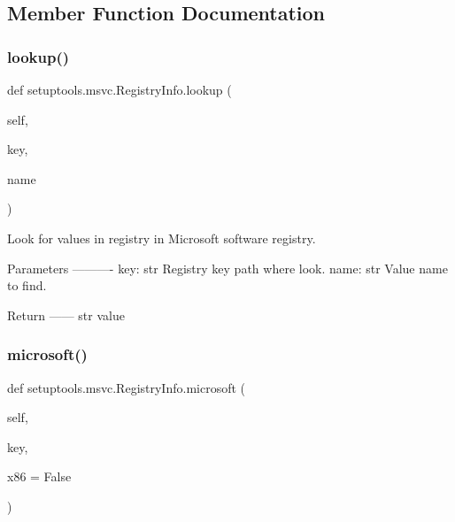 \subsection{Member Function Documentation}
\mbox{\label{classsetuptools_1_1msvc_1_1RegistryInfo_afc91b9bf7451e111733eebb84a3b27f6}} 
\subsubsection{\texorpdfstring{lookup()}{lookup()}}
{\footnotesize\ttfamily def setuptools.\+msvc.\+Registry\+Info.\+lookup (\begin{DoxyParamCaption}\item[{}]{self,  }\item[{}]{key,  }\item[{}]{name }\end{DoxyParamCaption})}

\begin{DoxyVerb}Look for values in registry in Microsoft software registry.

Parameters
----------
key: str
    Registry key path where look.
name: str
    Value name to find.

Return
------
str
    value
\end{DoxyVerb}
 \mbox{\label{classsetuptools_1_1msvc_1_1RegistryInfo_ac7992b4e588edd0aebb0a33fa266ebc8}} 
\subsubsection{\texorpdfstring{microsoft()}{microsoft()}}
{\footnotesize\ttfamily def setuptools.\+msvc.\+Registry\+Info.\+microsoft (\begin{DoxyParamCaption}\item[{}]{self,  }\item[{}]{key,  }\item[{}]{x86 = {\ttfamily False} }\end{DoxyParamCaption})}


